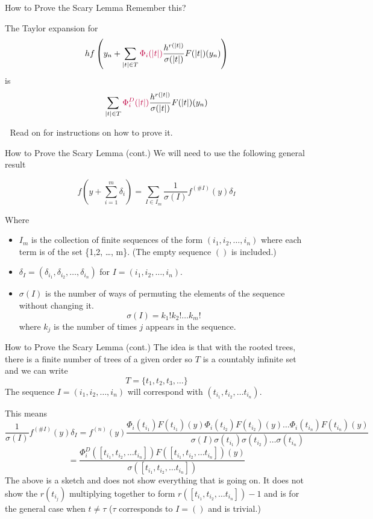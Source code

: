 \documentclass{beamer}
\def \purple{\textcolor{purple}}
\def \white{\textcolor{white}}
\begin{document}
\begin{frame}{How to Prove the Scary Lemma}
Remember this? \newline
\begin{lemma}
The Taylor expansion for
$$hf\left(y_n + \sum_{|t| \in T}{\purple{\Phi_i(|t|)}\frac{h^{r(|t|)}}{\sigma(|t|)}F(|t|)(y_n) }\right)$$
is
$$\sum_{|t| \in T}{\purple{\Phi_i^D(|t|)}\frac{h^{r(|t|)}}{\sigma(|t|)}F(|t|)(y_n) }$$
\end{lemma}
\white{.} \newline
Read on for instructions on how to prove it.
\end{frame}

\begin{frame}{How to Prove the Scary Lemma (cont.)}
We will need to use the following general result
\begin{theorem}
$$f(y + \sum_{i = 1}^m{\delta_i}) = \sum_{I \in I_m}{\frac{1}{\sigma(I)}f^{(\#I)}(y)}\delta_{I}$$
\end{theorem}
Where
\begin{itemize}
\item $I_m$ is the collection of finite sequences of the form $(i_1, i_2, \dots, i_n)$ 
where each term is of the set \{1,2, \dots, m\}. (The empty sequence $()$ is included.)
\item  $\delta_I = (\delta_{i_1}, \delta_{i_2}, \dots, \delta_{i_n})$ for $I = (i_1, i_2, \dots, i_n)$.  
\item $\sigma(I)$ is the number of ways of permuting the elements of the sequence without changing it.
$$\sigma(I) = k_1!k_2! \dots k_m!$$ 
where $k_j$ is the number of times $j$ appears in the sequence.
\end{itemize}
\end{frame}

\begin{frame}{How to Prove the Scary Lemma (cont.)}
The idea is that with the rooted trees, there is a finite number of trees of a given order 
so $T$ is a countably infinite set and we can write
$$T = \{t_1, t_2, t_3, \dots \}$$
The sequence $I = (i_1, i_2, \dots, i_n)$ will correspond with $(t_{i_1}, t_{i_2}, \dots t_{i_n})$.

This means 
$$\frac{1}{\sigma(I)}f^{(\#I)}(y)\delta_I = 
f^{(n)}(y)\frac{\Phi_i(t_{i_1})F(t_{i_1})(y) \Phi_i(t_{i_2})F(t_{i_2})(y) \dots \Phi_i(t_{i_n})F(t_{i_n})(y)}
{\sigma(I) \sigma(t_{i_1})\sigma(t_{i_2}) \dots \sigma(t_{i_n})}$$ 
$$= \frac{\Phi_i^D(\left[ t_{i_1}, t_{i_2}, \dots t_{i_n} \right])F(\left[ t_{i_1}, t_{i_2}, \dots t_{i_n} \right])(y)}
{\sigma(\left[ t_{i_1}, t_{i_2}, \dots t_{i_n} \right])}$$
The above is a sketch and does not show everything that is going on. It does not show the ${r(t_{i_j})}$
multiplying together to form $r(\left[ t_{i_1}, t_{i_2}, \dots t_{i_n} \right]) - 1$ and is for the general case
when $t \ne \tau$ ($\tau$ corresponds to $I = ()$ and is trivial.) 
\end{frame}
\end{document}
